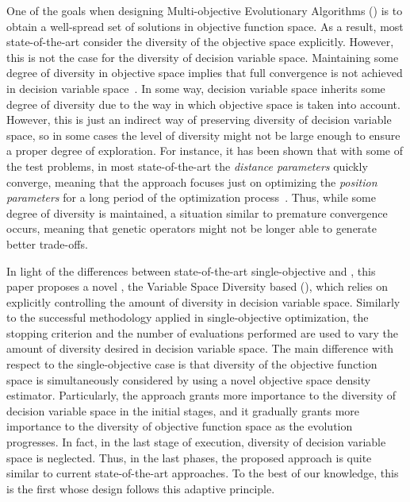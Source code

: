 One of the goals when designing Multi-objective Evolutionary Algorithms (\MOEAS{}) is to obtain a well-spread 
set of solutions in objective function space.
%
As a result, most state-of-the-art \MOEAS{} consider the diversity of the objective space explicitly.
%
However, this is not the case for the diversity of decision variable space.
%
Maintaining some degree of diversity in objective space implies that full convergence 
is not achieved in decision variable space~\citep{Joel:GDE3_CEC09}.
%
In some way, decision variable space inherits some degree of diversity due to the way in which objective space is 
taken into account. 
%
However, this is just an indirect way of preserving diversity of decision variable space, so 
in some cases the level of diversity might not be large enough to ensure a proper degree of exploration.
%
For instance, it has been shown that with some of the \WFG{} test problems, in most state-of-the-art \MOEAS{}
the \textit{distance parameters} quickly converge, meaning that the approach focuses just on optimizing the
\textit{position parameters} for a long period of the optimization process~\citep{castillo2017multi}.
%
Thus, while some degree of diversity is maintained, a situation similar to premature convergence occurs,
meaning that genetic operators might not be longer able to generate better trade-offs. 

In light of the differences between state-of-the-art single-objective \EAS{} and \MOEAS{}, 
this paper proposes a novel \MOEA{}, the Variable Space Diversity based \MOEA{} (\VSDMOEA{}), 
which relies on explicitly controlling the amount of diversity in decision variable space.
%
Similarly to the successful methodology applied in single-objective optimization, the stopping criterion and the 
number of evaluations performed are used to vary the amount of diversity desired in decision variable space.
%
The main difference with respect to the single-objective case is that diversity of the objective function space 
is simultaneously considered by using a novel objective space density estimator.
%
Particularly, the approach grants more importance to the diversity of decision variable space in the initial stages, and 
it gradually grants more importance to the diversity of objective function space as the evolution progresses.
%
In fact, in the last stage of execution, diversity of decision variable space is neglected. Thus, 
in the last phases, the proposed approach is quite similar to current state-of-the-art approaches.
%
To the best of our knowledge, this is the first \MOEA{} whose design follows this adaptive principle.

